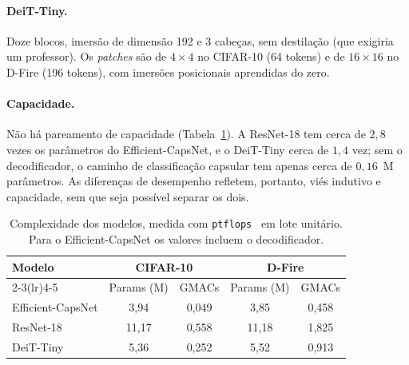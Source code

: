 \paragraph{DeiT-Tiny.}
Doze blocos, imersão de dimensão 192 e 3 cabeças, sem destilação (que exigiria
um professor). Os \emph{patches} são de $4\times4$ no CIFAR-10 (64 tokens) e de
$16\times16$ no D-Fire (196 tokens), com imersões posicionais aprendidas do zero.

\paragraph{Capacidade.}
Não há pareamento de capacidade (Tabela~\ref{tab:model-complexity}). A
ResNet-18 tem cerca de $2{,}8$ vezes os parâmetros do Efficient-CapsNet, e o
DeiT-Tiny cerca de $1{,}4$ vez; sem o decodificador, o caminho de classificação
capsular tem apenas cerca de $0{,}16$~M parâmetros. As diferenças de desempenho
refletem, portanto, viés indutivo e capacidade, sem que seja possível separar os
dois.

\begin{table}[htb]
  \centering
  \caption{Complexidade dos modelos, medida com \texttt{ptflops}~\cite{ptflops}
  em lote unitário. Para o Efficient-CapsNet os valores incluem o decodificador.}
  \label{tab:model-complexity}
  \small
  \begin{tabular}{lcccc}
    \toprule
    \multirow{2}{*}{Modelo} & \multicolumn{2}{c}{CIFAR-10} & \multicolumn{2}{c}{D-Fire} \\
    \cmidrule(lr){2-3}\cmidrule(lr){4-5}
     & Params (M) & GMACs & Params (M) & GMACs \\
    \midrule
    Efficient-CapsNet & 3,94  & 0,049 & 3,85  & 0,458 \\
    ResNet-18         & 11,17 & 0,558 & 11,18 & 1,825 \\
    DeiT-Tiny         & 5,36  & 0,252 & 5,52  & 0,913 \\
    \bottomrule
  \end{tabular}
\end{table}